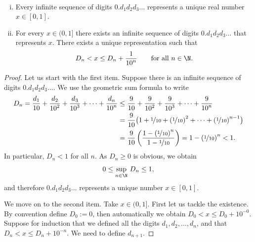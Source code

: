 \documentclass[12pt]{book}
\begin{document}
\begin{prop} \label{prop:decimalprop}
{~}
\begin{enumerate}[(i)]
\item
Every infinite sequence of digits
$0.d_1d_2d_3\ldots$ represents a unique real number $x \in [0,1]$.
\item
For every $x \in (0,1]$ there exists an infinite sequence of digits
$0.d_1d_2d_3\ldots$ that represents $x$.
There exists a unique representation such that
\begin{equation*}
D_n < x \leq D_n+\frac{1}{{10}^n} \qquad \text{for all $n \in \N$}.
\end{equation*}
\end{enumerate}
\end{prop}

\begin{proof}
Let us start with the first item.
Suppose there is an infinite sequence of
digits $0.d_1d_2d_3\ldots$.
We use the geometric sum formula to write
\begin{equation*}
\begin{split}
D_n =
\frac{d_1}{10} + 
\frac{d_2}{{10}^2} + 
\frac{d_3}{{10}^3} + 
\cdots +
\frac{d_n}{{10}^n} 
& \leq
\frac{9}{10} + 
\frac{9}{{10}^2} + 
\frac{9}{{10}^3} + 
\cdots +
\frac{9}{{10}^n} 
\\
& =
\frac{9}{10}
\bigl( 1 + \nicefrac{1}{10} + 
{(\nicefrac{1}{10})}^2 + \cdots + 
{(\nicefrac{1}{10})}^{n-1} \bigr)
\\
& =
\frac{9}{10}
\left(
\frac{1-{(\nicefrac{1}{10})}^{n}}{1-\nicefrac{1}{10}}
\right)
= 1-{(\nicefrac{1}{10})}^{n}
< 1 .
\end{split}
\end{equation*}
In particular, $D_n < 1$ for all $n$.
As $D_n \geq 0$ is obvious, we obtain
\begin{equation*}
0 \leq \sup_{n\in \N} \, D_n \leq 1 ,
\end{equation*}
and therefore $0.d_1d_2d_3\ldots$ represents a unique number $x \in [0,1]$.

We move on to the
second item.
Take $x \in (0,1]$.
First let us tackle the existence.
By convention define $D_0 := 0$,
then automatically we obtain
$D_0 < x \leq D_0 + {10}^{-0}$.
Suppose for induction that we defined all the digits $d_1,d_2,\ldots,d_n$,
and that 
$D_n < x \leq D_n + {10}^{-n}$.
We need to define $d_{n+1}$.


\end{proof}
\end{document}
